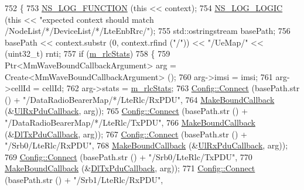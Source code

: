 \begin{DoxyCode}
752 \{
753   \hyperlink{log-macros-disabled_8h_a90b90d5bad1f39cb1b64923ea94c0761}{NS\_LOG\_FUNCTION} (\textcolor{keyword}{this} << context);
754   \hyperlink{group__logging_ga88acd260151caf2db9c0fc84997f45ce}{NS\_LOG\_LOGIC} (\textcolor{keyword}{this} << \textcolor{stringliteral}{"expected context  should match /NodeList/*/DeviceList/*/LteEnbRrc/"});
755   std::ostringstream basePath;
756   basePath <<  context.substr (0, context.rfind (\textcolor{stringliteral}{"/"})) << \textcolor{stringliteral}{"/UeMap/"} << (uint32\_t) rnti;
757   \textcolor{keywordflow}{if} (\hyperlink{classns3_1_1MmWaveBearerStatsConnector_a3613ebbbe92cd828e66b03c91c7ebcbb}{m\_rlcStats})
758     \{
759       Ptr<MmWaveBoundCallbackArgument> arg = Create<MmWaveBoundCallbackArgument> ();
760       arg->imsi = imsi;
761       arg->cellId = cellId; 
762       arg->stats = \hyperlink{classns3_1_1MmWaveBearerStatsConnector_a3613ebbbe92cd828e66b03c91c7ebcbb}{m\_rlcStats};
763       \hyperlink{group__config_ga4014f151241cd0939b6cb64409605736}{Config::Connect} (basePath.str () + \textcolor{stringliteral}{"/DataRadioBearerMap/*/LteRlc/RxPDU"},
764                        \hyperlink{group__makeboundcallback_ga1725d6362e6065faa0709f7c93f8d770}{MakeBoundCallback} (&\hyperlink{namespacens3_a269527c03607c9c885d7cff7667ec5e0}{UlRxPduCallback}, arg));
765       \hyperlink{group__config_ga4014f151241cd0939b6cb64409605736}{Config::Connect} (basePath.str () + \textcolor{stringliteral}{"/DataRadioBearerMap/*/LteRlc/TxPDU"},
766                        \hyperlink{group__makeboundcallback_ga1725d6362e6065faa0709f7c93f8d770}{MakeBoundCallback} (&\hyperlink{namespacens3_a7de82f7ed9986b9bcb67951f61e02ff4}{DlTxPduCallback}, arg));
767       \hyperlink{group__config_ga4014f151241cd0939b6cb64409605736}{Config::Connect} (basePath.str () + \textcolor{stringliteral}{"/Srb0/LteRlc/RxPDU"},
768                        \hyperlink{group__makeboundcallback_ga1725d6362e6065faa0709f7c93f8d770}{MakeBoundCallback} (&\hyperlink{namespacens3_a269527c03607c9c885d7cff7667ec5e0}{UlRxPduCallback}, arg));
769       \hyperlink{group__config_ga4014f151241cd0939b6cb64409605736}{Config::Connect} (basePath.str () + \textcolor{stringliteral}{"/Srb0/LteRlc/TxPDU"},
770                        \hyperlink{group__makeboundcallback_ga1725d6362e6065faa0709f7c93f8d770}{MakeBoundCallback} (&\hyperlink{namespacens3_a7de82f7ed9986b9bcb67951f61e02ff4}{DlTxPduCallback}, arg));
771       \hyperlink{group__config_ga4014f151241cd0939b6cb64409605736}{Config::Connect} (basePath.str () + \textcolor{stringliteral}{"/Srb1/LteRlc/RxPDU"},

\end{DoxyCode}
